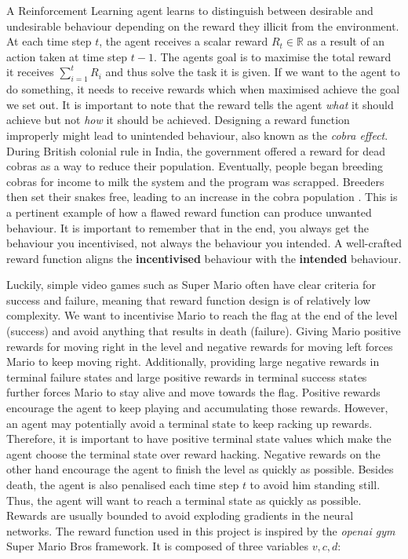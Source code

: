 \documentclass[notitlepage,a4paper,11pt]{article}
\newcommand{\R}{\mathbb{R}}
\begin{document}
A Reinforcement Learning agent learns to distinguish between desirable and undesirable behaviour depending on the reward they illicit from the environment. At each time step $t$, the agent receives a scalar reward $R_t \in \R$ as a result of an action taken at time step $t-1$. The agents goal is to maximise the total reward it receives $\sum^{t}_{i=1} R_i$ and thus solve the task it is given. If we want to the agent to do something, it needs to receive rewards which when maximised achieve the goal we set out. It is important to note that the reward tells the agent \textit{what} it should achieve but not \textit{how} it should be achieved. Designing a reward function improperly might lead to unintended behaviour, also known as the \textit{cobra effect}. During British colonial rule in India, the government offered a reward for dead cobras as a way to reduce their population. Eventually, people began breeding cobras for income to milk the system and the program was scrapped. Breeders then set their snakes free, leading to an increase in the cobra population \cite{siebert2001kobra}. This is a pertinent example of how a flawed reward function can produce unwanted behaviour. It is important to remember that in the end, you always get the behaviour you incentivised, not always the behaviour you intended. A well-crafted reward function aligns the \textbf{incentivised} behaviour with the \textbf{intended} behaviour.

Luckily, simple video games such as Super Mario often have clear criteria for success and failure, meaning that reward function design is of relatively low complexity. We want to incentivise Mario to reach the flag at the end of the level (success) and avoid anything that results in death (failure). Giving Mario positive rewards for moving right in the level and negative rewards for moving left forces Mario to keep moving right. Additionally, providing large negative rewards in terminal failure states and large positive rewards in terminal success states further forces Mario to stay alive and move towards the flag. Positive rewards encourage the agent to keep playing and accumulating those rewards. However, an agent may potentially avoid a terminal state to keep racking up rewards. Therefore, it is important to have positive terminal state values which make the agent choose the terminal state over reward hacking. Negative rewards on the other hand encourage the agent to finish the level as quickly as possible. Besides death, the agent is also penalised each time step $t$ to avoid him standing still. Thus, the agent will want to reach a terminal state as quickly as possible. Rewards are usually bounded to avoid exploding gradients in the neural networks.
\linebreak
The reward function used in this project is inspired by the  \textit{openai gym} Super Mario Bros framework. It is composed of three variables $v, c, d$:
\end{document}
